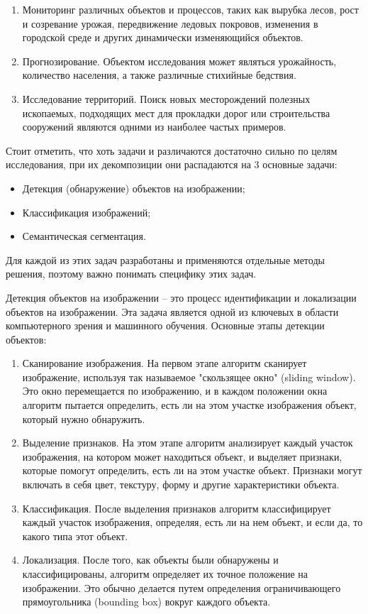 \documentclass[14pt, russian]{scrartcl}
\begin{document}
\begin{enumerate}
    \item Мониторинг различных объектов и процессов, таких как вырубка лесов, рост и созревание урожая, передвижение ледовых покровов, изменения в городской среде и других динамически изменяющийся объектов.
    \item Прогнозирование. Объектом исследования может являться урожайность, количество населения, а также различные стихийные бедствия.
    \item Исследование территорий. Поиск новых месторождений полезных ископаемых, подходящих мест для прокладки дорог или строительства сооружений являются одними из наиболее частых примеров.
\end{enumerate}

Стоит отметить, что хоть задачи и различаются достаточно сильно по целям исследования, при их декомпозиции они распадаются на 3 основные задачи:

\begin{itemize}
    \item Детекция (обнаружение) объектов на изображении;
    \item Классификация изображений;
    \item Семантическая сегментация.
\end{itemize}

Для каждой из этих задач разработаны и применяются отдельные методы решения, поэтому важно понимать специфику этих задач.

Детекция объектов на изображении – это процесс идентификации и локализации объектов на изображении. Эта задача является одной из ключевых в области компьютерного зрения и машинного обучения. Основные этапы детекции объектов:

\begin{enumerate}
    \item Сканирование изображения. На первом этапе алгоритм сканирует изображение, используя так называемое "скользящее окно" (sliding window). Это окно перемещается по изображению, и в каждом положении окна алгоритм пытается определить, есть ли на этом участке изображения объект, который нужно обнаружить.
    \item Выделение признаков. На этом этапе алгоритм анализирует каждый участок изображения, на котором может находиться объект, и выделяет признаки, которые помогут определить, есть ли на этом участке объект. Признаки могут включать в себя цвет, текстуру, форму и другие характеристики объекта.
    \item Классификация. После выделения признаков алгоритм классифицирует каждый участок изображения, определяя, есть ли на нем объект, и если да, то какого типа этот объект.
    \item Локализация. После того, как объекты были обнаружены и классифицированы, алгоритм определяет их точное положение на изображении. Это обычно делается путем определения ограничивающего прямоугольника (bounding box) вокруг каждого объекта.
\end{enumerate}
\end{document}

